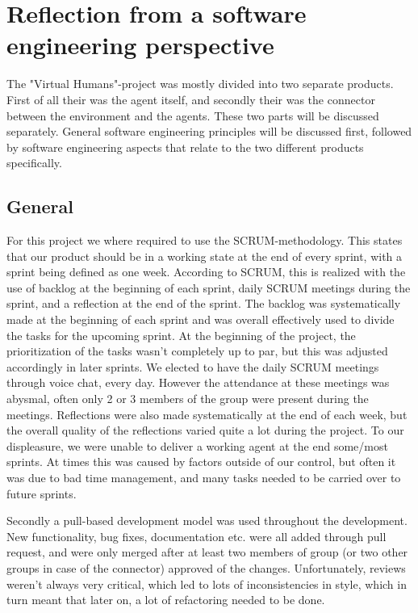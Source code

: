 \chapter{Reflection from a software engineering perspective}
\label{sec:Reflection from a software engineering perspective}

The "Virtual Humans"-project was mostly divided into two separate products.
First of all their was the agent itself, and secondly their was the connector between the environment and the agents.
These two parts will be discussed separately. General software engineering principles will be  discussed first,
followed by software engineering aspects that relate to the two different products specifically.

\section{General}
\label{sub:General}

For this project we where required to use the SCRUM-methodology. This states that our product should be in a working state at the end of every sprint, with a sprint being defined as one week.
According to SCRUM, this is realized with the use of backlog at the beginning of each sprint, daily SCRUM meetings during the sprint, and a reflection at the end of the sprint.
The backlog was systematically made at the beginning of each sprint and was overall effectively used to divide the tasks for the upcoming sprint.
At the beginning of the project, the prioritization of the tasks wasn't completely up to par, but this was adjusted accordingly in later sprints.
We elected to have the daily SCRUM meetings through voice chat, every day. However the attendance at these meetings was abysmal, often only 2 or 3 members of the group were present during the meetings.
Reflections were also made systematically at the end of each week, but the overall quality of the reflections varied quite a lot during the project.
To our displeasure, we were unable to deliver a working agent at the end some/most sprints. At times this was caused by factors outside of our control, but often it was due to bad time management,
and many tasks needed to be carried over to future sprints.

Secondly a pull-based development model was used throughout the development. New functionality, bug fixes, documentation etc. were all added through pull request, and were only merged after at least
two members of group (or two other groups in case of the connector) approved of the changes.
Unfortunately, reviews weren't always very critical, which led to lots of inconsistencies in style, which in turn meant that later on, a lot of refactoring needed to be done.

